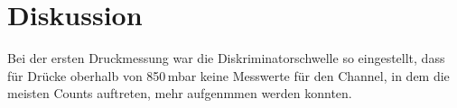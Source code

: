 \section{Diskussion}
\label{sec:Diskussion}

Bei der ersten Druckmessung war die Diskriminatorschwelle so eingestellt, dass
für Drücke oberhalb von 850\,mbar keine Messwerte für den Channel, in dem die
meisten Counts auftreten, mehr aufgenmmen werden konnten.
